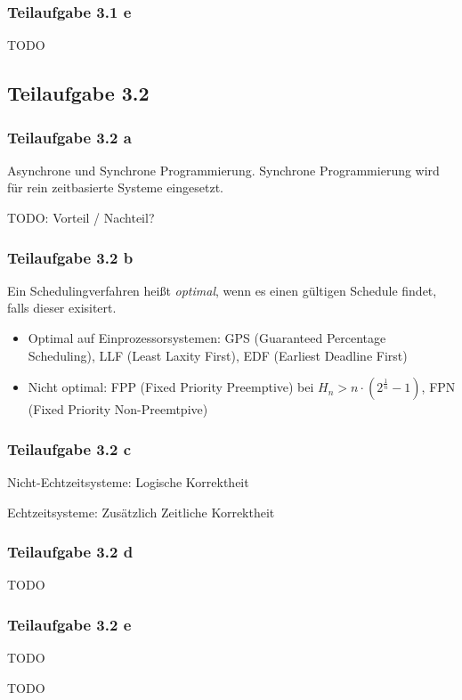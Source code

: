 \documentclass[a4paper]{scrartcl}
\begin{document}
  \subsubsection*{Teilaufgabe 3.1 e}
  TODO

  \subsection*{Teilaufgabe 3.2}
  \subsubsection*{Teilaufgabe 3.2 a}
  Asynchrone und Synchrone Programmierung.
  Synchrone Programmierung wird für rein zeitbasierte Systeme eingesetzt.

  TODO: Vorteil / Nachteil?


  \subsubsection*{Teilaufgabe 3.2 b}
  Ein Schedulingverfahren heißt \textit{optimal}, wenn es einen gültigen
  Schedule findet, falls dieser exisitert.

  \begin{itemize}
      \item Optimal auf Einprozessorsystemen: GPS (Guaranteed Percentage Scheduling),
            LLF (Least Laxity First),
            EDF (Earliest Deadline First)
      \item Nicht optimal: FPP (Fixed Priority Preemptive) bei $H_n > n \cdot (2^{\frac{1}{n}} - 1)$,
            FPN (Fixed Priority Non-Preemtpive)
  \end{itemize}


  \subsubsection*{Teilaufgabe 3.2 c}
  Nicht-Echtzeitsysteme: Logische Korrektheit

  Echtzeitsysteme: Zusätzlich Zeitliche Korrektheit


  \subsubsection*{Teilaufgabe 3.2 d}
  TODO

  \subsubsection*{Teilaufgabe 3.2 e}
  \begin{enumerate*}[label=(\arabic*)]
      \item TODO
      \item TODO
  \end{enumerate*}
\end{document}
